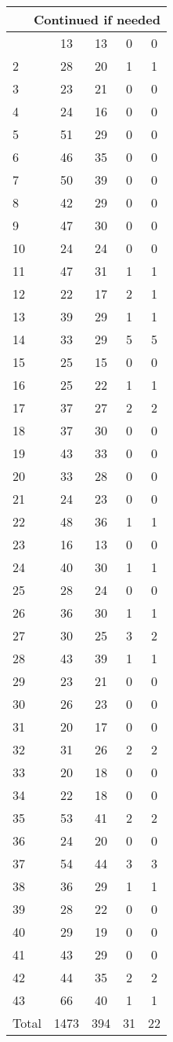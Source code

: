\begin{center}
\begin{longtable}{l|c|c|c|c}
\hline \multicolumn{5}{|r|}{{Continued if needed}} \\ \hline
\endfoot 
1 & 13 & 13 & 0 & 0\\ \hline
2 & 28 & 20 & 1 & 1\\ \hline
3 & 23 & 21 & 0 & 0\\ \hline
4 & 24 & 16 & 0 & 0\\ \hline
5 & 51 & 29 & 0 & 0\\ \hline
6 & 46 & 35 & 0 & 0\\ \hline
7 & 50 & 39 & 0 & 0\\ \hline
8 & 42 & 29 & 0 & 0\\ \hline
9 & 47 & 30 & 0 & 0\\ \hline
10 & 24 & 24 & 0 & 0\\ \hline
11 & 47 & 31 & 1 & 1\\ \hline
12 & 22 & 17 & 2 & 1\\ \hline
13 & 39 & 29 & 1 & 1\\ \hline
14 & 33 & 29 & 5 & 5\\ \hline
15 & 25 & 15 & 0 & 0\\ \hline
16 & 25 & 22 & 1 & 1\\ \hline
17 & 37 & 27 & 2 & 2\\ \hline
18 & 37 & 30 & 0 & 0\\ \hline
19 & 43 & 33 & 0 & 0\\ \hline
20 & 33 & 28 & 0 & 0\\ \hline
21 & 24 & 23 & 0 & 0\\ \hline
22 & 48 & 36 & 1 & 1\\ \hline
23 & 16 & 13 & 0 & 0\\ \hline
24 & 40 & 30 & 1 & 1\\ \hline
25 & 28 & 24 & 0 & 0\\ \hline
26 & 36 & 30 & 1 & 1\\ \hline
27 & 30 & 25 & 3 & 2\\ \hline
28 & 43 & 39 & 1 & 1\\ \hline
29 & 23 & 21 & 0 & 0\\ \hline
30 & 26 & 23 & 0 & 0\\ \hline
31 & 20 & 17 & 0 & 0\\ \hline
32 & 31 & 26 & 2 & 2\\ \hline
33 & 20 & 18 & 0 & 0\\ \hline
34 & 22 & 18 & 0 & 0\\ \hline
35 & 53 & 41 & 2 & 2\\ \hline
36 & 24 & 20 & 0 & 0\\ \hline
37 & 54 & 44 & 3 & 3\\ \hline
38 & 36 & 29 & 1 & 1\\ \hline
39 & 28 & 22 & 0 & 0\\ \hline
40 & 29 & 19 & 0 & 0\\ \hline
41 & 43 & 29 & 0 & 0\\ \hline
42 & 44 & 35 & 2 & 2\\ \hline
43 & 66 & 40 & 1 & 1\\ \hline
\hline \hline
Total & 1473 & 394 & 31 & 22




\end{longtable}
\end{center}
